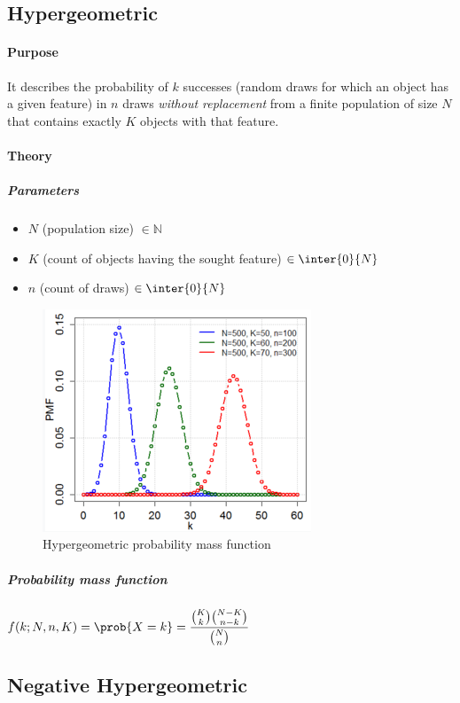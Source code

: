 \subsection{Hypergeometric}
\paragraph{Purpose}
It describes the probability of $k$ successes (random draws for which an object has a given feature)
in $n$ draws \emph{without replacement} from a finite population of size $N$ that contains exactly 
$K$ objects with that feature.
\paragraph{Theory}
\subparagraph{Parameters}
\begin{itemize}
    \item $N$ (population size) $\in\mathbb{N}$
    \item $K$ (count of objects having the sought feature) $\in\inter{0}{N}$
    \item $n$ (count of draws) $\in\inter{0}{N}$
\end{itemize}
\begin{figure}[H]
    \begin{center}
        \includegraphics[width=.5\textwidth]{./chapters/2_statistics/02_common_probability_distributions/images/02_hypergeometric_pmf.png}
    \end{center}
    \caption{Hypergeometric probability mass function}
    \label{fig:02_hypergeometric_pmf}
\end{figure}

\subparagraph{Probability mass function}
$f(k; N, n, K) = \prob{X=k} = \dfrac{{K\choose k}{N-K\choose n-k}}{{N\choose n}}$

\subsection{Negative Hypergeometric}
